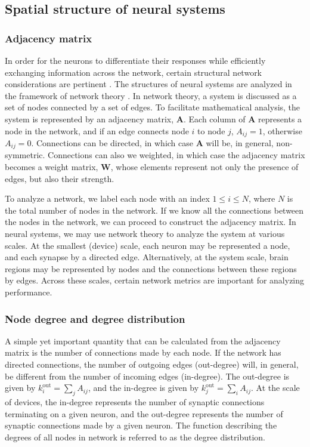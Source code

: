 \documentclass[twocolumn]{article}
\begin{document}
\subsection{Spatial structure of neural systems}
\subsubsection{Adjacency matrix}
In order for the neurons to differentiate their responses while efficiently exchanging information across the network, certain structural network considerations are pertinent \cite{rusp2010}. The structures of neural systems are analyzed in the framework of network theory \cite{eskn2015}. In network theory, a system is discussed as a set of nodes connected by a set of edges. To facilitate mathematical analysis, the system is represented by an adjacency matrix, $\mathbf{A}$. Each column of $\mathbf{A}$ represents a node in the network, and if an edge connects node $i$ to node $j$, $A_{ij} = 1$, otherwise $A_{ij} = 0$. Connections can be directed, in which case $\mathbf{A}$ will be, in general, non-symmetric. Connections can also we weighted, in which case the adjacency matrix becomes a weight matrix, $\mathbf{W}$, whose elements represent not only the presence of edges, but also their strength.

To analyze a network, we label each node with an index $1\le i\le N$, where $N$ is the total number of nodes in the network. If we know all the connections between the nodes in the network, we can proceed to construct the adjacency matrix. In neural systems, we may use network theory to analyze the system at various scales. At the smallest (device) scale, each neuron may be represented a node, and each synapse by a directed edge. Alternatively, at the system scale, brain regions may be represented by nodes and the connections between these regions by edges. Across these scales, certain network metrics are important for analyzing performance. 

\subsubsection{Node degree and degree distribution}
A simple yet important quantity that can be calculated from the adjacency matrix is the number of connections made by each node. If the network has directed connections, the number of outgoing edges (out-degree) will, in general, be different from the number of incoming edges (in-degree). The out-degree is given by $k^{\mathrm{out}}_i = \sum_jA_{ij}$, and the in-degree is given by $k^{\mathrm{out}}_j = \sum_iA_{ij}$. At the scale of devices, the in-degree represents the number of synaptic connections terminating on a given neuron, and the out-degree represents the number of synaptic connections made by a given neuron. The function describing the degrees of all nodes in network is referred to as the degree distribution.
\end{document}
